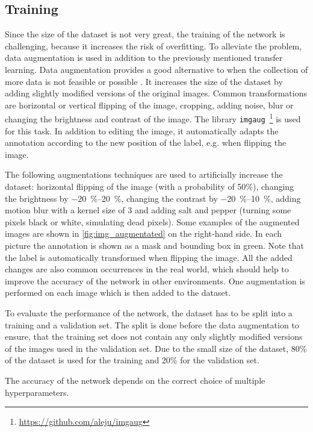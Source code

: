 \subsection{Training}
\label{ssec:training}
Since the size of the dataset is not very great, the training of the network is challenging, because it increases the risk of overfitting.
To alleviate the problem, data augmentation is used in addition to the previously mentioned transfer learning.
Data augmentation provides a good alternative to when the collection of more data is not feasible or possible \cite{Shorten2019}.
It increases the size of the dataset by adding slightly modified versions of the original images.
Common transformations are horizontal or vertical flipping of the image, cropping, adding noise, blur or changing the brightness and contrast of the image.
The library \texttt{imgaug}~\footnote{\url{https://github.com/aleju/imgaug}} \cite{Jung2018} is used for this task.
In addition to editing the image, it automatically adapts the annotation according to the new position of the label, e.g. when flipping the image.\par
The following augmentations techniques are used to artificially increase the dataset: horizontal flipping of the image (with a probability of 50\%), changing the brightness by \SIrange{-20}{20}{\percent}, changing the contrast by \SIrange{-20}{10}{\percent}, adding motion blur with a kernel size of 3 and adding salt and pepper (turning some pixels black or white, simulating dead pixels).
Some examples of the augmented images are shown in \cref{fig:img_augmentated} on the right-hand side.
In each picture the annotation is shown as a mask and bounding box in green.
Note that the label is automatically transformed when flipping the image.
All the added changes are also common occurrences in the real world, which should help to improve the accuracy of the network in other environments.
One augmentation is performed on each image which is then added to the dataset.\par
To evaluate the performance of the network, the dataset has to be split into a training and a validation set.
The split is done before the data augmentation to ensure, that the training set does not contain any only slightly modified versions of the images used in the validation set.
Due to the small size of the dataset, 80\% of the dataset is used for the training and 20\% for the validation set.\par
The accuracy of the network depends on the correct choice of multiple hyperparameters.
